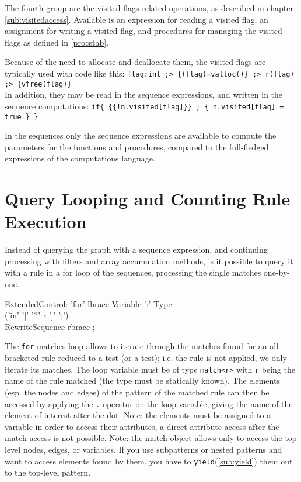 The fourth group are the visited flags related operations,
as described in chapter \ref{sub:visitedaccess}.
Available is an expression for reading a visited flag, an assignment for writing a visited flag, and procedures for managing the visited flags as defined in \ref{procstab}.

\begin{example}
Because of the need to allocate and deallocate them, the visited flags are typically used with code like this:
\verb#flag:int ;> {(flag)=valloc()} ;> r(flag) ;> {vfree(flag)}#\\
In addition, they may be read in the sequence expressions, and written in the sequence computations:
\verb#if{ {{!n.visited[flag]}} ; { n.visited[flag] = true } }#
\end{example}

In the sequences only the sequence expressions are available to compute the parameters for the functions and procedures, compared to the full-fledged expressions of the computations language.



\section{Query Looping and Counting Rule Execution}

Instead of querying the graph with a sequence expression, and continuing processing with filters and array accumulation methods, is it possible to query it with a rule in a for loop of the sequences, processing the single matches one-by-one.

\begin{rail}
  ExtendedControl:
    'for' lbrace Variable ':' Type\\
    ('in' '[' '?' r ']' ';')\\
    RewriteSequence rbrace
    ;
\end{rail}\label{formatch}

The \texttt{for} matches loop allows to iterate through the matches found for an all-bracketed rule reduced to a test (or a test); i.e. the rule is not applied, we only iterate its matches.
The loop variable must be of type \texttt{match<r>} with \texttt{r} being the name of the rule matched (the type must be statically known).
The elements (esp. the nodes and edges) of the pattern of the matched rule can then be accessed by applying the \texttt{.}-operator on the loop variable, giving the name of the element of interest after the dot.
Note: the elements must be assigned to a variable in order to access their attributes, a direct attribute access after the match access is not possible.
Note: the match object allows only to access the top level nodes, edges, or variables.
If you use subpatterns or nested patterns and want to access elements found by them, you have to \texttt{yield}(\ref{sub:yield}) them out to the top-level pattern.

